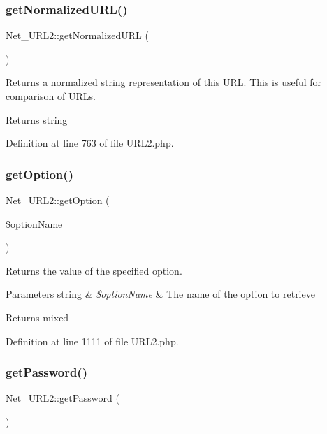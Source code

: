 \subsubsection{\texorpdfstring{get\+Normalized\+U\+R\+L()}{getNormalizedURL()}}
{\footnotesize\ttfamily Net\+\_\+\+U\+R\+L2\+::get\+Normalized\+U\+RL (\begin{DoxyParamCaption}{ }\end{DoxyParamCaption})}

Returns a normalized string representation of this U\+RL. This is useful for comparison of U\+R\+Ls.

\begin{DoxyReturn}{Returns}
string 
\end{DoxyReturn}


Definition at line 763 of file U\+R\+L2.\+php.

\hypertarget{classNet__URL2_a4da2891e3eac1700940ae6cf483a0dd3}{}\label{classNet__URL2_a4da2891e3eac1700940ae6cf483a0dd3} 
\subsubsection{\texorpdfstring{get\+Option()}{getOption()}}
{\footnotesize\ttfamily Net\+\_\+\+U\+R\+L2\+::get\+Option (\begin{DoxyParamCaption}\item[{}]{\$option\+Name }\end{DoxyParamCaption})}

Returns the value of the specified option.


\begin{DoxyParams}[1]{Parameters}
string & {\em \$option\+Name} & The name of the option to retrieve\\
\hline
\end{DoxyParams}
\begin{DoxyReturn}{Returns}
mixed 
\end{DoxyReturn}


Definition at line 1111 of file U\+R\+L2.\+php.

\hypertarget{classNet__URL2_a8cfbc773d2c8bb6727da1526770c4b9a}{}\label{classNet__URL2_a8cfbc773d2c8bb6727da1526770c4b9a} 
\subsubsection{\texorpdfstring{get\+Password()}{getPassword()}}
{\footnotesize\ttfamily Net\+\_\+\+U\+R\+L2\+::get\+Password (\begin{DoxyParamCaption}{ }\end{DoxyParamCaption})}

